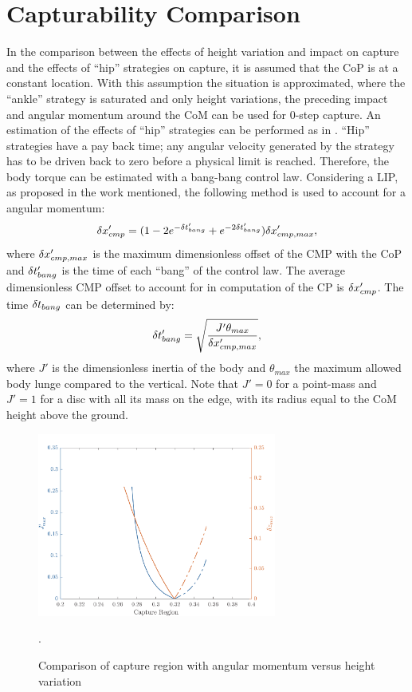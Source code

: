 \section{Capturability Comparison}
In the comparison between the effects of height variation and impact on capture and the effects of ``hip'' strategies on capture, it is assumed that the \ac{CoP} is at a constant location. With this assumption the situation is approximated, where the ``ankle'' strategy is saturated and only height variations, the preceding impact and angular momentum around the \ac{CoM} can be used for 0-step capture.
\paraskip
An estimation of the effects of ``hip'' strategies can be performed as in \cite{pratt2006capture, koolen2012capturability}. ``Hip'' strategies have a pay back time; any angular velocity generated by the strategy has to be driven back to zero before a physical limit is reached. Therefore, the body torque can be estimated with a bang-bang control law.  Considering a \ac{LIP}, as proposed in the work mentioned, the following method is used to account for a angular momentum:
\begin{equation}
\delta x_{cmp}' = (1-2e^{-\delta t_{bang}'}+e^{-2\delta t_{bang}'})\delta x_{cmp,max}',
\end{equation}
where $\delta x_{cmp,max}'$ is the maximum dimensionless offset of the \ac{CMP} with the \ac{CoP} and $\delta t_{bang}'$ is the time of each ``bang'' of the control law. The average dimensionless \ac{CMP} offset to account for in computation of the \ac{CP} is $\delta x_{cmp}'$. The time $\delta t_{bang}$ can be determined by:
\begin{equation}
\delta t_{bang}' = \sqrt{\frac{J'\theta_{max}}{\delta x_{cmp,max}'}},
\end{equation}
where $J'$ is the dimensionless inertia of the body and $\theta_{max}$ the maximum allowed body lunge compared to the vertical. Note that $J'=0$ for a point-mass and $J'=1$ for a disc with all its mass on the edge, with its radius equal to the \ac{CoM} height above the ground. 
\begin{figure}[h]
\centering
\includegraphics[width=0.7\textwidth]{STYLESTUFF/capcompare.png}
\caption{Comparison of capture region with angular momentum versus height variation}.
\label{fig:capcompare}
\end{figure}
